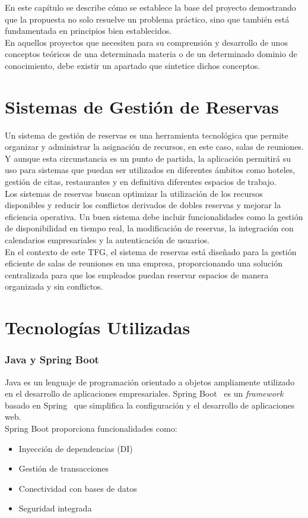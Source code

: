 
En este capítulo se describe cómo se establece la base del proyecto demostrando que la propuesta no solo resuelve un problema práctico, sino que también está fundamentada en principios bien establecidos.\\

En aquellos proyectos que necesiten para su comprensión y desarrollo de unos conceptos teóricos de una determinada materia o de un determinado dominio de conocimiento, debe existir un apartado que sintetice dichos conceptos.

\section{Sistemas de Gestión de Reservas}

Un sistema de gestión de reservas es una herramienta tecnológica que permite organizar y administrar la asignación de recursos, en este caso, salas de reuniones. Y aunque esta circunstancia es un punto de partida, la aplicación permitirá su uso para sistemas que puedan ser utilizados en diferentes ámbitos como hoteles, gestión de citas, restaurantes y en definitiva diferentes espacios de trabajo.\\

Los sistemas de reservas buscan optimizar la utilización de los recursos disponibles y reducir los conflictos derivados de dobles reservas y mejorar la eficiencia operativa. Un buen sistema debe incluir funcionalidades como la gestión de disponibilidad en tiempo real, la modificación de reservas, la integración con calendarios empresariales y la autenticación de usuarios.\\

En el contexto de este TFG, el sistema de reservas está diseñado para la gestión eficiente de salas de reuniones en una empresa, proporcionando una solución centralizada para que los empleados puedan reservar espacios de manera organizada y sin conflictos.

\section{Tecnologías Utilizadas}
\subsubsection{Java y Spring Boot}
Java es un lenguaje de programación orientado a objetos ampliamente utilizado en el desarrollo de aplicaciones empresariales. Spring Boot~\cite{spring-boot} es un \emph{framework}~\cite{framework} basado en Spring~\cite{spring} que simplifica la configuración y el desarrollo de aplicaciones web.\\
Spring Boot proporciona funcionalidades como:
\begin{itemize}
\tightlist
\item
Inyección de dependencias (DI)
\item
Gestión de transacciones
\item
Conectividad con bases de datos
\item
Seguridad integrada
\end{itemize}

